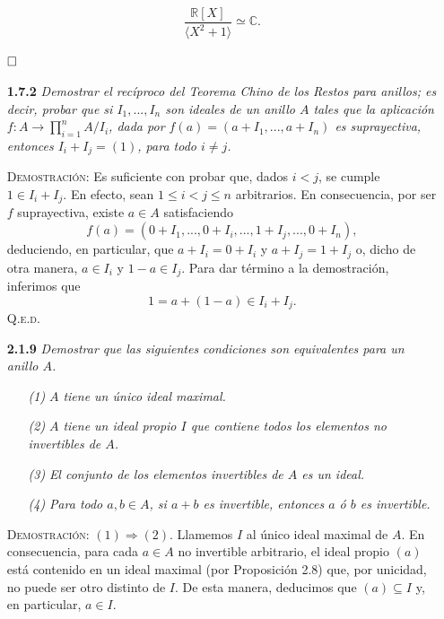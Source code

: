 \documentclass{article}
\begin{document}
\begin{enumerate}
    \[\frac{\mathbb{R}[X]}{\langle X^2 + 1 \rangle} \simeq \mathbb{C}.\]

    $\hfill\square$

    \vspace{12px}

    \item[\textbf{1.7.2}] \textit{Demostrar el recíproco del Teorema Chino de los Restos para anillos; es decir, probar que si $I_1, ..., I_n$ son ideales de un anillo $A$ tales que la aplicación $f : A \to \prod_{i=1}^{n} A / I_i$, dada por $f(a) = (a + I_1, ..., a + I_n)$ es suprayectiva, entonces $I_i + I_j = (1)$, para todo $i \neq j$.}

    \vspace{7px}

    \textsc{Demostración}: Es suficiente con probar que, dados $i < j$, se cumple $1 \in I_i + I_j$. En efecto, sean $1 \leq i < j \leq n$ arbitrarios. En consecuencia, por ser $f$ suprayectiva, existe $a \in A$ satisfaciendo \[f(a) = (0 + I_1, ..., 0 + I_i, ..., 1 + I_j, ..., 0 + I_n),\] deduciendo, en particular, que $a + I_i = 0 + I_i$ y $a + I_j = 1 + I_j$ o, dicho de otra manera, $a \in I_i$ y $1 - a \in I_j$. Para dar término a la demostración, inferimos que \[1 = a + (1 - a) \in I_i + I_j.\] \hfill{\textsc{Q.e.d.}}

    \newpage

    \item[\textbf{2.1.9}] \textit{Demostrar que las siguientes condiciones son equivalentes para un anillo $A$.}
    \begin{itemize}
        \item[\textit{(1)}] \textit{$A$ tiene un único ideal maximal.}
        \item[\textit{(2)}] \textit{$A$ tiene un ideal propio $I$ que contiene todos los elementos no invertibles de $A$.}
        \item[\textit{(3)}] \textit{El conjunto de los elementos invertibles de $A$ es un ideal.}
        \item[\textit{(4)}] \textit{Para todo $a, b \in A$, si $a + b$ es invertible, entonces $a$ ó $b$ es invertible.}
    \end{itemize}

    \vspace{7px}

    \textsc{Demostración}: $(1) \Rightarrow (2)$. Llamemos $I$ al único ideal maximal de $A$. En consecuencia, para cada $a \in A$ no invertible arbitrario, el ideal propio $(a)$ está contenido en un ideal maximal (por Proposición 2.8) que, por unicidad, no puede ser otro distinto de $I$. De esta manera, deducimos que $(a) \subseteq I$ y, en particular, $a \in I$.


\end{enumerate}
\end{document}
